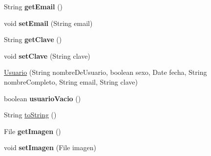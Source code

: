 \begin{DoxyCompactItemize}
\item 
\hypertarget{classcom_1_1ucab_1_1javachat_1_1_servidor_1_1model_1_1_usuario_a62a69897b00dc760eda6401c003e0201}{String {\bfseries get\-Email} ()}\label{classcom_1_1ucab_1_1javachat_1_1_servidor_1_1model_1_1_usuario_a62a69897b00dc760eda6401c003e0201}

\item 
\hypertarget{classcom_1_1ucab_1_1javachat_1_1_servidor_1_1model_1_1_usuario_aa4f8f9ea1493e0116f44a79bf265d290}{void {\bfseries set\-Email} (String email)}\label{classcom_1_1ucab_1_1javachat_1_1_servidor_1_1model_1_1_usuario_aa4f8f9ea1493e0116f44a79bf265d290}

\item 
\hypertarget{classcom_1_1ucab_1_1javachat_1_1_servidor_1_1model_1_1_usuario_a2020589e80c54523b0598f728d1db13d}{String {\bfseries get\-Clave} ()}\label{classcom_1_1ucab_1_1javachat_1_1_servidor_1_1model_1_1_usuario_a2020589e80c54523b0598f728d1db13d}

\item 
\hypertarget{classcom_1_1ucab_1_1javachat_1_1_servidor_1_1model_1_1_usuario_a0335592bf0c6db9fd52a32dfed8dc74e}{void {\bfseries set\-Clave} (String clave)}\label{classcom_1_1ucab_1_1javachat_1_1_servidor_1_1model_1_1_usuario_a0335592bf0c6db9fd52a32dfed8dc74e}

\item 
\hyperlink{classcom_1_1ucab_1_1javachat_1_1_servidor_1_1model_1_1_usuario_a872f8793c72bd2c849e581556ca3edc7}{Usuario} (String nombre\-De\-Usuario, boolean sexo, Date fecha, String nombre\-Completo, String email, String clave)
\item 
\hypertarget{classcom_1_1ucab_1_1javachat_1_1_servidor_1_1model_1_1_usuario_ab8d31feaf359f00aba0c0ace2244a9f0}{boolean {\bfseries usuario\-Vacio} ()}\label{classcom_1_1ucab_1_1javachat_1_1_servidor_1_1model_1_1_usuario_ab8d31feaf359f00aba0c0ace2244a9f0}

\item 
String \hyperlink{classcom_1_1ucab_1_1javachat_1_1_servidor_1_1model_1_1_usuario_adaf9b1d169695c1b3076f03ca7c001e8}{to\-String} ()
\item 
\hypertarget{classcom_1_1ucab_1_1javachat_1_1_servidor_1_1model_1_1_usuario_a072f3af09402e06f27132028d780e582}{File {\bfseries get\-Imagen} ()}\label{classcom_1_1ucab_1_1javachat_1_1_servidor_1_1model_1_1_usuario_a072f3af09402e06f27132028d780e582}

\item 
\hypertarget{classcom_1_1ucab_1_1javachat_1_1_servidor_1_1model_1_1_usuario_aad545dd99b1519cbc97e7af1be9f6fac}{void {\bfseries set\-Imagen} (File imagen)}\label{classcom_1_1ucab_1_1javachat_1_1_servidor_1_1model_1_1_usuario_aad545dd99b1519cbc97e7af1be9f6fac}

\end{DoxyCompactItemize}


